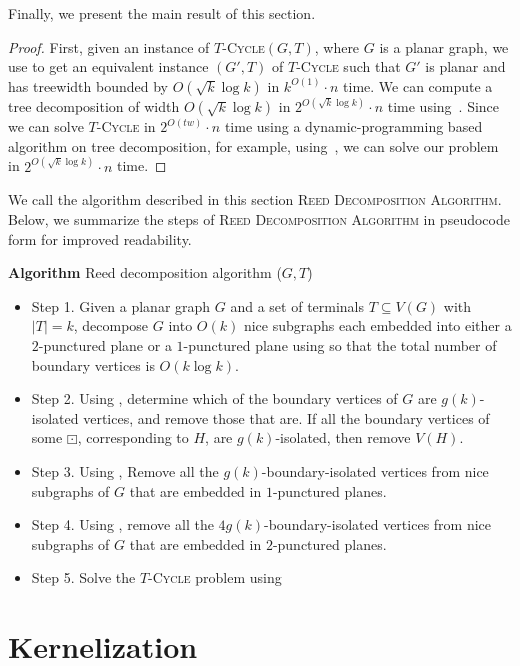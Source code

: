 \documentclass{article}
\numberwithin{claimcounter}{lemma}
\newcommand{\tcycle}{$T$-\textsc{Cycle}\xspace}
\begin{document}
Finally, we present the main result of this section.
\mainFPT*
\begin{proof}
    First, given an instance of \tcycle $(G,T)$, where $G$ is a planar graph, we use  to get an equivalent instance $(G',T)$ of \tcycle such that $G'$ is planar and has treewidth bounded by $O( \sqrt{k} \log k)$ in $k^{O(1)}\cdot n$ time. We can compute a tree decomposition of width $O (\sqrt{k} \log k)$ in $2^{O (\sqrt{k} \log k)}\cdot n$ time using~\cite{treewidthSingle}.  Since we can solve \tcycle in $2^{O(tw)}\cdot n$ time using a dynamic-programming based algorithm on tree decomposition, for example, using~\cite{DBLP:journals/jcss/DornFT12}, we can solve our problem in $2^{O(\sqrt{k}\log k)}\cdot n$ time.  
\end{proof}

We call the algorithm described in this section \textsc{Reed Decomposition Algorithm}.
Below, we summarize the steps of \textsc{Reed Decomposition Algorithm} in pseudocode form for improved readability.

\noindent
{\bf Algorithm} {\sc Reed decomposition algorithm} ($G,T$)
\begin{itemize}
\item Step 1. Given a planar graph $G$ and a set of terminals $T\subseteq V(G)$ with $|T|=k$, decompose $G$ into $O(k)$ nice subgraphs each embedded into either a $2$-punctured  plane or a $1$-punctured plane using  so that the total number of boundary vertices is $O(k \log k)$. 
\item Step 2. Using , determine which of the boundary vertices of $G$ are  $g(k)$-isolated vertices, and remove those that are. If all the boundary vertices of some $\boxdot$, corresponding to $H$, are $g(k)$-isolated, then remove $V(H)$. 

\item Step 3. Using , Remove all the $g(k)$-boundary-isolated vertices from nice subgraphs of $G$ that are embedded in $1$-punctured planes.
\item Step 4.  Using , remove all the $4 g(k)$-boundary-isolated vertices from nice subgraphs of $G$ that are embedded in $2$-punctured planes.

\item Step 5. Solve the \tcycle problem using  
\end{itemize}



\section{Kernelization} \label{sec:kernel}
\end{document}

